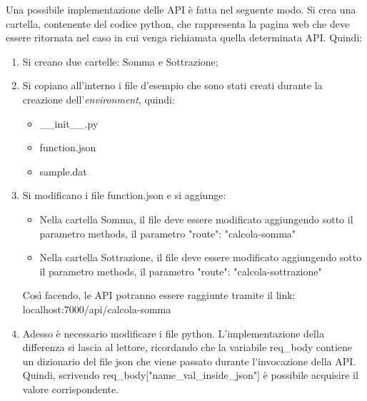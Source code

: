 \documentclass[a4paper]{article}
\begin{document}
	\noindent
	Una possibile implementazione delle API è fatta nel seguente modo. Si crea una cartella, contenente del codice python, che rappresenta la pagina web che deve essere ritornata nel caso in cui venga richiamata quella determinata API. Quindi:
	\begin{enumerate}
		\item Si creano due cartelle: Somma e Sottrazione;
		
		\item Si copiano all'interno i file d'esempio che sono stati creati durante la creazione dell'\emph{environment}, quindi:
		\begin{itemize}
			\item \textsf{\_\_init\_\_.py}
			
			\item \textsf{function.json}
			
			\item \textsf{sample.dat}
		\end{itemize}
		
		\item Si modificano i file \textsf{function.json} e si aggiunge:
		\begin{itemize}
			\item Nella cartella Somma, il file deve essere modificato aggiungendo sotto il parametro \textsf{methods}, il parametro \textsf{"route": "calcola-somma"}
			\item Nella cartella Sottrazione, il file deve essere modificato aggiungendo sotto il parametro \textsf{methods}, il parametro \textsf{"route": "calcola-sottrazione"}
		\end{itemize}
		Così facendo, le API potranno essere raggiunte tramite il link: localhost:7000/api/calcola-somma
		
		\item Adesso è necessario modificare i file python. L'implementazione della differenza si lascia al lettore, ricordando che la variabile \textsf{req\_body} contiene un dizionario del file json che viene passato durante l'invocazione della API. Quindi, scrivendo \textsf{req\_body["name\_val\_inside\_json"]} è possibile acquisire il valore corrispondente.
		
	\end{enumerate}
\end{document}
